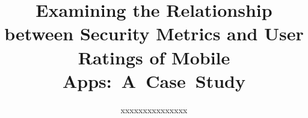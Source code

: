 \documentclass{sig-alternate-05-2015}
\newif\ifisnopii
\begin{document}
\title{Examining the Relationship between Security Metrics and User Ratings of Mobile Apps:~A~Case~Study}


\ifisnopii %
\author{
%
\alignauthor
Daniel E. Krutz, Casey Klimkowsky, Shannon Trudeau, Adam Blaine, \\ Meiyappan Nagappan, Andrew Meneely, and Sam Malachowsky\\ 	
       \affaddr{Rochester Institute of Technology, Rochester, NY, USA}\\
       \email{\{dxkvse, cek3403, smt9020, amb8805, mxnvse, axmvse, samvse\}@rit.edu}
       \alignauthor
} %

\else %
\author{
%
\alignauthor
xxxxxxxxxxxxxxx\\ 	
	\\
       \\
       \\
        \\
       \alignauthor
} %
\fi %


\maketitle
\end{document}
